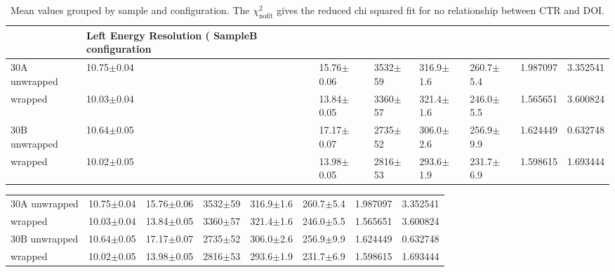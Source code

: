 \begin{table}
\caption{\label{tab:doiresults} Mean values grouped by sample and configuration. The $\chi^2_\text{nofit}$ gives the reduced chi squared fit for no relationship between CTR and DOI.}
\begin{tabular}{llllllrr}
\hline
& Left Energy Resolution (%
SampleB configuration &                      &                  &              &                &                &             &                        \\
\hline
30A     unwrapped     &       10.75$\pm$0.04 &   15.76$\pm$0.06 &  3532$\pm$59 &  316.9$\pm$1.6 &  260.7$\pm$5.4 &    1.987097 &               3.352541 \\
        wrapped       &       10.03$\pm$0.04 &   13.84$\pm$0.05 &  3360$\pm$57 &  321.4$\pm$1.6 &  246.0$\pm$5.5 &    1.565651 &               3.600824 \\
30B     unwrapped     &       10.64$\pm$0.05 &   17.17$\pm$0.07 &  2735$\pm$52 &  306.0$\pm$2.6 &  256.9$\pm$9.9 &    1.624449 &               0.632748 \\
        wrapped       &       10.02$\pm$0.05 &   13.98$\pm$0.05 &  2816$\pm$53 &  293.6$\pm$1.9 &  231.7$\pm$6.9 &    1.598615 &               1.693444 \\
\hline
\end{tabular}
\end{table}

\begin{tabular}{llllllrr}
\hline
30A     unwrapped     &       10.75$\pm$0.04 &   15.76$\pm$0.06 &  3532$\pm$59 &  316.9$\pm$1.6 &  260.7$\pm$5.4 &    1.987097 &               3.352541 \\
        wrapped       &       10.03$\pm$0.04 &   13.84$\pm$0.05 &  3360$\pm$57 &  321.4$\pm$1.6 &  246.0$\pm$5.5 &    1.565651 &               3.600824 \\
30B     unwrapped     &       10.64$\pm$0.05 &   17.17$\pm$0.07 &  2735$\pm$52 &  306.0$\pm$2.6 &  256.9$\pm$9.9 &    1.624449 &               0.632748 \\
        wrapped       &       10.02$\pm$0.05 &   13.98$\pm$0.05 &  2816$\pm$53 &  293.6$\pm$1.9 &  231.7$\pm$6.9 &    1.598615 &               1.693444 \\
\hline
\end{tabular}